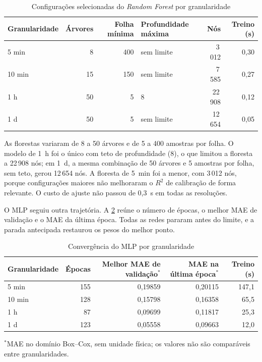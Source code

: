 \begin{table}[htbp]
    \centering
    \small
    \caption{Configurações selecionadas do \textit{Random Forest} por granularidade}
    \label{tab:resultados-config-rf}
    \begin{tabular}{lrrlrr}
        \toprule
        Granularidade & Árvores & Folha mínima & Profundidade máxima & Nós & Treino (s) \\
        \midrule
        5 min  & 8  & 400 & sem limite & 3\,012  & 0,30 \\
        10 min & 15 & 150 & sem limite & 7\,585  & 0,27 \\
        1 h    & 50 & 5   & 8          & 22\,908 & 0,12 \\
        1 d    & 50 & 5   & sem limite & 12\,654 & 0,05 \\
        \bottomrule
    \end{tabular}
\end{table}

As florestas variaram de 8 a 50 árvores e de 5 a 400 amostras por
folha. O modelo de 1~h foi o único com teto de profundidade (8), o que
limitou a floresta a 22\,908 nós; em 1~d, a mesma combinação de 50
árvores e 5 amostras por folha, sem teto, gerou 12\,654 nós. A floresta
de 5~min foi a menor, com 3\,012 nós, porque configurações maiores não
melhoraram o $R^2$ de calibração de forma relevante. O custo de ajuste
não passou de 0,3~s em todas as resoluções.

O MLP seguiu outra trajetória. A
\cref{tab:resultados-convergencia-mlp} reúne o número de épocas, o
melhor MAE de validação e o MAE da última época. Todas as redes
pararam antes do limite, e a parada antecipada restaurou os pesos do
melhor ponto.

\begin{table}[htbp]
    \centering
    \small
    \caption{Convergência do MLP por granularidade}
    \label{tab:resultados-convergencia-mlp}
    \begin{tabular}{lrrrr}
        \toprule
        Granularidade & Épocas & Melhor MAE de validação$^{*}$ & MAE na última época$^{*}$ & Treino (s) \\
        \midrule
        5 min  & 155 & 0,19859 & 0,20115 & 147,1 \\
        10 min & 128 & 0,15798 & 0,16358 & 65,5 \\
        1 h    & 87  & 0,09699 & 0,11817 & 25,3 \\
        1 d    & 123 & 0,05558 & 0,09663 & 12,0 \\
        \bottomrule
    \end{tabular}

    {\footnotesize $^{*}$MAE no domínio Box--Cox, sem unidade física; os valores não são comparáveis entre granularidades.}
\end{table}

